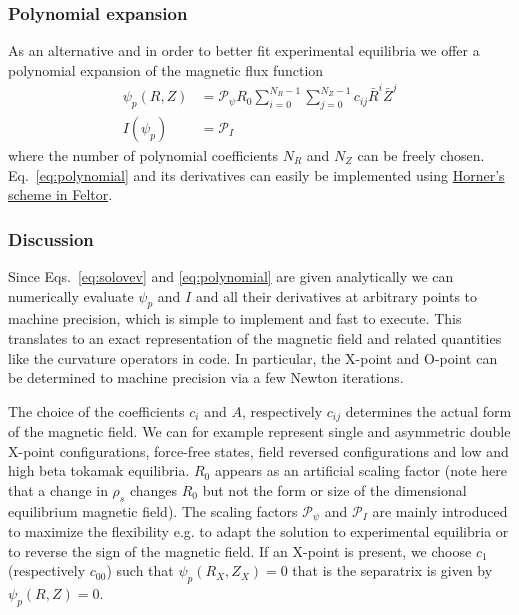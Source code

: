 \subsubsection{Polynomial expansion}
As an alternative and in order to better fit experimental equilibria we offer
a polynomial expansion of the magnetic flux function
\begin{subequations}
\label{eq:polynomial}
\begin{align}
    \psi_p(R,Z) &= \mathcal P_\psi R_0\sum_{i=0}^{N_R-1}\sum_{j=0}^{N_Z-1} c_{ij}\bar R^i\bar Z^j\\
   I(\psi_p) &= \mathcal P_I
\end{align}
\end{subequations}
where the number of polynomial coefficients $N_R$ and $N_Z$ can be freely chosen.
Eq.~\eqref{eq:polynomial} and its derivatives can easily be implemented using
\href{file:///home/matthias/Projekte/feltor/doc/dg/html/structdg_1_1_horner2d.html}{Horner's scheme in Feltor}.

\subsubsection{Discussion}
Since Eqs.~\eqref{eq:solovev} and \eqref{eq:polynomial} are given analytically we can numerically evaluate $\psi_p$ and $I$
and all their derivatives
at arbitrary points to machine precision, which is simple to implement and fast to execute.
This translates to an exact representation of the magnetic field and related
quantities like the curvature operators in code. In particular,
the X-point and O-point can be determined to machine
precision via a few Newton iterations.

The choice of the coefficients \(c_{i}\) and \(A\), respectively $c_{ij}$ determines the actual form
of the magnetic field.
We can for example represent single and asymmetric double X-point configurations, force-free states,
field reversed configurations and low and high beta tokamak equilibria.
$R_0$ appears as an artificial scaling factor
(note here that a change in $\rho_s$ changes $R_0$ but not the form or size of
the dimensional equilibrium magnetic field).
The scaling factors $\mathcal P_\psi$ and $\mathcal P_I$ are mainly introduced to maximize the flexibility e.g. to adapt the solution to experimental equilibria or to reverse the sign of the magnetic field.
If an X-point is present, we choose $c_1$ (respectively $c_{00}$) such that
$\psi_p(R_X, Z_X) = 0$ that is the separatrix is given by $\psi_p(R,Z) = 0$.

